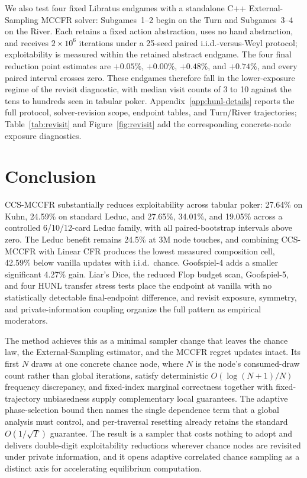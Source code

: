 \documentclass[11pt]{article}
\begin{document}
We also test four fixed Libratus endgames with a standalone C++ External-Sampling MCCFR solver: Subgames~1--2 begin on the Turn and Subgames~3--4 on the River. Each retains a fixed action abstraction, uses no hand abstraction, and receives $2\times10^6$ iterations under a 25-seed paired i.i.d.-versus-Weyl protocol; exploitability is measured within the retained abstract endgame. The four final reduction point estimates are $+0.05\%$, $+0.00\%$, $+0.48\%$, and $+0.74\%$, and every paired interval crosses zero. These endgames therefore fall in the lower-exposure regime of the revisit diagnostic, with median visit counts of 3 to 10 against the tens to hundreds seen in tabular poker. Appendix~\ref{app:hunl-details} reports the full protocol, solver-revision scope, endpoint tables, and Turn/River trajectories; Table~\ref{tab:revisit} and Figure~\ref{fig:revisit} add the corresponding concrete-node exposure diagnostics.

\section{Conclusion}

CCS-MCCFR substantially reduces exploitability across tabular poker: 27.64\% on Kuhn, 24.59\% on standard Leduc, and 27.65\%, 34.01\%, and 19.05\% across a controlled 6/10/12-card Leduc family, with all paired-bootstrap intervals above zero. The Leduc benefit remains 24.5\% at 3M node touches, and combining CCS-MCCFR with Linear CFR produces the lowest measured composition cell, 42.59\% below vanilla updates with i.i.d.\ chance. Goofspiel-4 adds a smaller significant 4.27\% gain. Liar's Dice, the reduced Flop budget scan, Goofspiel-5, and four HUNL transfer stress tests place the endpoint at vanilla with no statistically detectable final-endpoint difference, and revisit exposure, symmetry, and private-information coupling organize the full pattern as empirical moderators.

The method achieves this as a minimal sampler change that leaves the chance law, the External-Sampling estimator, and the MCCFR regret updates intact. Its first $N$ draws at one concrete chance node, where $N$ is the node's consumed-draw count rather than global iterations, satisfy deterministic $O(\!\log(N+1)/N)$ frequency discrepancy, and fixed-index marginal correctness together with fixed-trajectory unbiasedness supply complementary local guarantees. The adaptive phase-selection bound then names the single dependence term that a global analysis must control, and per-traversal resetting already retains the standard $O(1/\sqrt{T})$ guarantee. The result is a sampler that costs nothing to adopt and delivers double-digit exploitability reductions wherever chance nodes are revisited under private information, and it opens adaptive correlated chance sampling as a distinct axis for accelerating equilibrium computation.
\end{document}
